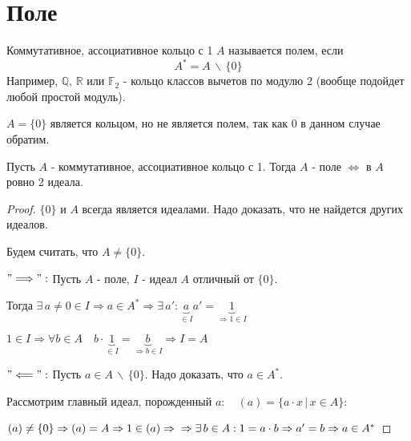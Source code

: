 \section{Поле}
\begin{conj}
    Коммутативное, ассоциативное кольцо с 1 $A$ называется полем, если
    \[ A^* = A\, \backslash\, \{ 0 \} \]
    Например, $\mathbb{Q},\, \mathbb{R}$ или $\mathbb{F}_2$ - кольцо классов вычетов по модулю 2 (вообще подойдет любой простой модуль).
\end{conj}
\begin{notice}
    $A = \{ 0 \}$ является кольцом, но не является полем, так как 0 в данном случае обратим.
\end{notice}
\begin{theorem-non}
    Пусть $A$ - коммутативное, ассоциативное кольцо с 1. Тогда $A$ - поле $\Leftrightarrow$ в $A$ ровно 2 идеала.
\end{theorem-non}
\begin{proof} \quad 
  
    $\{ 0 \}$ и $A$ всегда является идеалами. Надо доказать, что не найдется других идеалов.
  
    Будем считать, что $A \neq \{ 0 \}$. 
  
    $"\Longrightarrow":$ Пусть $A$ - поле, $I$ - идеал $A$ отличный от $\{ 0 \}$. 
    
    Тогда $\exists\, a \neq 0 \in I \Rightarrow a \in A^* \Rightarrow \exists\, a' : \underbrace{a}_{\in I}a' = \underbrace{1}_{\Rightarrow  1 \in I}$
    
    $1 \in I \Rightarrow \forall b \in A \quad b \cdot \underbrace{1}_{\in I} = \underbrace{b}_{\Rightarrow b \in I} \Rightarrow I = A$
  
    $"\Longleftarrow":$ Пусть $a \in A\, \backslash \, \{ 0 \} $. Надо доказать, что $a \in A^*$.
  
    Рассмотрим главный идеал, порожденный $a: \quad (a) = \{ a \cdot x\, |\, x \in A \} $:
  
    $(a) \neq \{  0 \} \Rightarrow (a) = A \Rightarrow 1 \in (a) \Rightarrow \\\\
    \Rightarrow \exists \, b \in A : 1 = a \cdot b \Rightarrow a' = b \Rightarrow a \in A^*$
\end{proof}
\vspace{0.7cm}
  
